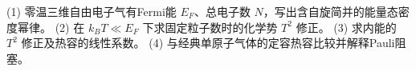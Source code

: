 (1) 零温三维自由电子气有Fermi能 \(E_F\)、总电子数 \(N\)，写出含自旋简并的能量态密度幂律。
(2) 在 \(k_BT\ll E_F\) 下求固定粒子数时的化学势 \(T^2\) 修正。
(3) 求内能的 \(T^2\) 修正及热容的线性系数。
(4) 与经典单原子气体的定容热容比较并解释Pauli阻塞。

